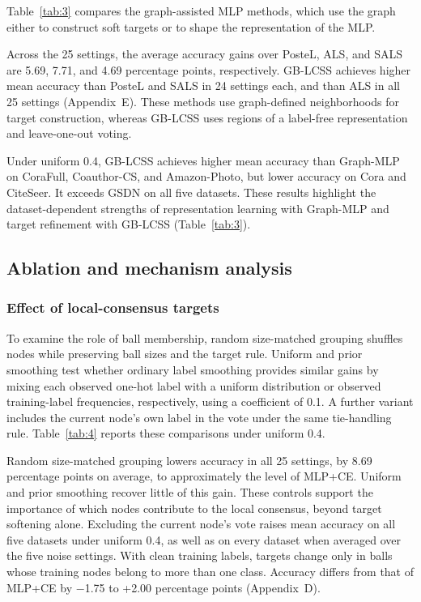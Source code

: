 \documentclass[times,review,10pt]{elsarticle}
\theoremstyle{definition}
\theoremstyle{plain}
\begin{document}
Table~\ref{tab:3} compares the graph-assisted MLP methods, which use the graph either to construct soft targets or to shape the representation of the MLP.



Across the 25 settings, the average accuracy gains over PosteL, ALS, and SALS are 5.69, 7.71, and 4.69 percentage points, respectively. GB-LCSS achieves higher mean accuracy than PosteL and SALS in 24 settings each, and than ALS in all 25 settings (Appendix~E). These methods use graph-defined neighborhoods for target construction, whereas GB-LCSS uses regions of a label-free representation and leave-one-out voting.

Under uniform 0.4, GB-LCSS achieves higher mean accuracy than Graph-MLP on CoraFull, Coauthor-CS, and Amazon-Photo, but lower accuracy on Cora and CiteSeer. It exceeds GSDN on all five datasets. These results highlight the dataset-dependent strengths of representation learning with Graph-MLP and target refinement with GB-LCSS (Table~\ref{tab:3}).

\subsection{Ablation and mechanism analysis}\label{sec:4.3}

\subsubsection{Effect of local-consensus targets}\label{sec:4.3.1}

To examine the role of ball membership, random size-matched grouping shuffles nodes while preserving ball sizes and the target rule. Uniform and prior smoothing test whether ordinary label smoothing provides similar gains by mixing each observed one-hot label with a uniform distribution or observed training-label frequencies, respectively, using a coefficient of 0.1. A further variant includes the current node's own label in the vote under the same tie-handling rule. Table~\ref{tab:4} reports these comparisons under uniform 0.4.



Random size-matched grouping lowers accuracy in all 25 settings, by 8.69 percentage points on average, to approximately the level of MLP+CE. Uniform and prior smoothing recover little of this gain. These controls support the importance of which nodes contribute to the local consensus, beyond target softening alone. Excluding the current node's vote raises mean accuracy on all five datasets under uniform 0.4, as well as on every dataset when averaged over the five noise settings. With clean training labels, targets change only in balls whose training nodes belong to more than one class. Accuracy differs from that of MLP+CE by \ensuremath{-}1.75 to +2.00 percentage points (Appendix~D).
\end{document}
